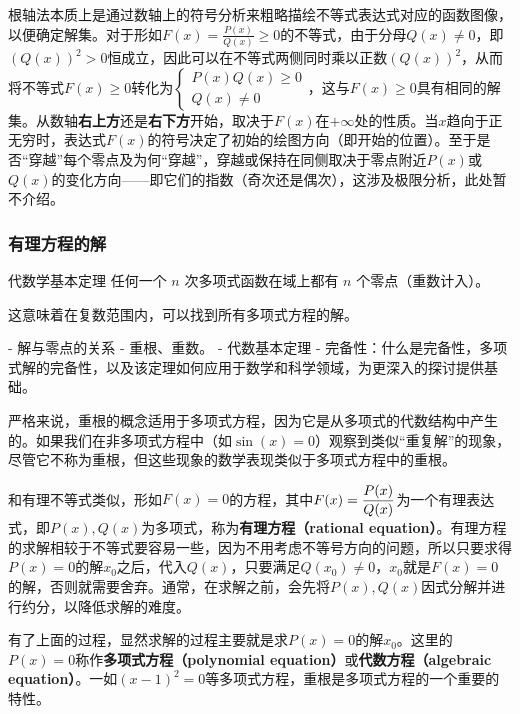 根轴法本质上是通过数轴上的符号分析来粗略描绘不等式表达式对应的函数图像，以便确定解集。对于形如$\displaystyle F(x) = \frac{P(x)}{Q(x)} \geq 0$的不等式，由于分母$Q(x) \neq 0$，即$\left(Q(x)\right)^2 > 0$恒成立，因此可以在不等式两侧同时乘以正数$\left(Q(x)\right)^2$，从而将不等式$\displaystyle F(x) \geq 0$转化为$\displaystyle\begin{cases}P(x)Q(x) \geq 0 \\ Q(x) \neq 0\end{cases}$，这与$F(x) \geq 0$具有相同的解集。从数轴\textbf{右上方}还是\textbf{右下方}开始，取决于$F(x)$在$+\infty$处的性质。当$x$趋向于正无穷时，表达式$F(x)$的符号决定了初始的绘图方向（即开始的位置）。至于是否“穿越”每个零点及为何“穿越”，穿越或保持在同侧取决于零点附近$P(x)$或$Q(x)$的变化方向——即它们的指数（奇次还是偶次），这涉及极限分析，此处暂不介绍。

\subsubsection{有理方程的解}



\begin{definition}{代数学基本定理}
任何一个 $n$ 次多项式函数在域上都有 $n$ 个零点（重数计入）。
\end{definition}
这意味着在复数范围内，可以找到所有多项式方程的解。

- 解与零点的关系
- 重根、重数。
- 代数基本定理
- 完备性：什么是完备性，多项式解的完备性，以及该定理如何应用于数学和科学领域，为更深入的探讨提供基础。


严格来说，重根的概念适用于多项式方程，因为它是从多项式的代数结构中产生的。如果我们在非多项式方程中（如$\sin(x) = 0$）观察到类似“重复解”的现象，尽管它不称为重根，但这些现象的数学表现类似于多项式方程中的重根。






和有理不等式类似，形如$F(x)=0$的方程，其中$\displaystyle F(x)={P(x)\over Q(x)}$为一个有理表达式，即$P(x),Q(x)$为多项式，称为\textbf{有理方程（rational equation）}。有理方程的求解相较于不等式要容易一些，因为不用考虑不等号方向的问题，所以只要求得$P(x)=0$的解$x_0$之后，代入$Q(x)$，只要满足$Q(x_0)\neq0$，$x_0$就是$F(x)=0$的解，否则就需要舍弃。通常，在求解之前，会先将$P(x),Q(x)$因式分解并进行约分，以降低求解的难度。

有了上面的过程，显然求解的过程主要就是求$P(x)=0$的解$x_0$。这里的$P(x)=0$称作\textbf{多项式方程（polynomial equation）}或\textbf{代数方程（algebraic equation）}。一如$(x-1)^2=0$等多项式方程，重根是多项式方程的一个重要的特性。

